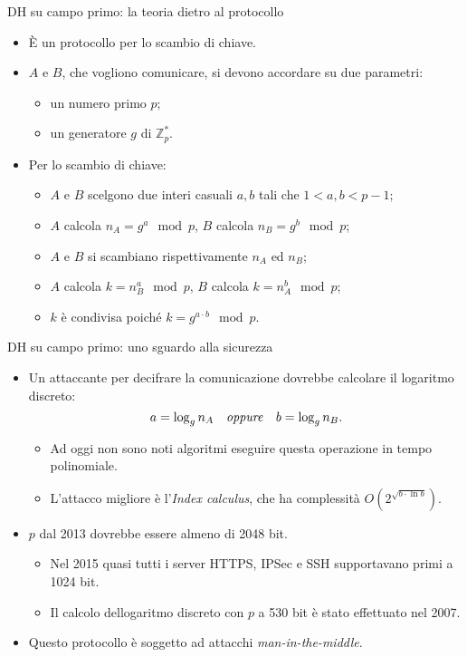 \documentclass[11pt,svgnames,smaller,aspectratio=169,italian]{beamer}
\begin{document}
\begin{frame}{DH su campo primo: la teoria dietro al protocollo}
	\begin{itemize}
		\item È un protocollo per lo scambio di chiave.
		\item $A$ e $B$, che vogliono comunicare, si devono accordare su due parametri:
			\begin{itemize}
				\item un numero primo $p$;
				\item un generatore $g$ di $\mathds{Z}_{p}^{*}$.
			\end{itemize}
		\item Per lo scambio di chiave:
			\begin{itemize}
				\item $A$ e $B$ scelgono due interi casuali $a, b$ tali che $1 < a, b < p - 1$;
				\item $A$ calcola $n_{A} = g^{a} \mod p$, $B$ calcola $n_{B} = g^{b} \mod p$;
				\item $A$ e $B$ si scambiano rispettivamente $n_{A}$ ed $n_{B}$;
				\item $A$ calcola $k = n_{B}^{a} \mod p$, $B$ calcola $k = n_{A}^{b} \mod p$;
				\item $k$ è condivisa poiché $k = g^{a \cdot b} \mod p$.
			\end{itemize}
	\end{itemize}
\end{frame}

\begin{frame}{DH su campo primo: uno sguardo alla sicurezza}
	\begin{itemize}
		\item Un attaccante per decifrare la comunicazione dovrebbe calcolare il logaritmo discreto:
			\begin{equation*}
				a = \log_{g} n_{A}	\quad\text{\emph{oppure}}	\quad b = \log_{g} n_{B}.
			\end{equation*}
			\begin{itemize}
				\item Ad oggi non sono noti algoritmi eseguire questa operazione in tempo polinomiale.
				\item L'attacco migliore è l'\emph{Index calculus}, che ha complessità $O(2^{\sqrt{b \cdot \ln b}})$.
			\end{itemize}
		\item $p$ dal 2013 dovrebbe essere almeno di 2048 bit.
			\begin{itemize}
				\item Nel 2015 quasi tutti i server HTTPS, IPSec e SSH supportavano primi a 1024 bit.
				\item Il calcolo dellogaritmo discreto con $p$ a 530 bit è stato effettuato nel 2007.
			\end{itemize}
		\item Questo protocollo è soggetto ad attacchi \emph{man-in-the-middle}.
	\end{itemize}
\end{frame}
\end{document}

